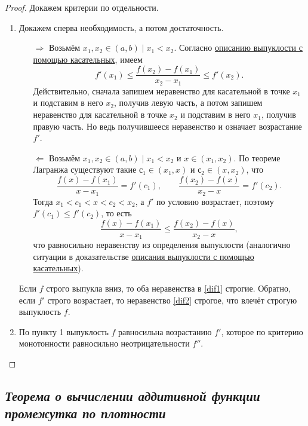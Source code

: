 \begin{proof}
	Докажем критерии по отдельности.
	\begin{enumerate}
		\item Докажем сперва необходимость, а потом достаточность.
		\begin{enumerate}
			\item[\(\Rightarrow\)] \label{dif}Возьмём \(x_1, x_2 \in (a, b) \mid x_1 < x_2\). Согласно \hyperlink{vypkas}{описанию выпуклости с помощью касательных}, имеем
			\begin{equation}
				\label{dif1}
				f'(x_1) \leqslant \frac{f(x_2) - f(x_1)}{x_2 - x_1} \leqslant f'(x_2).
			\end{equation}
			Действительно, сначала запишем неравенство для касательной в точке \(x_1\) и подставим в него \(x_2\), получив левую часть, а потом запишем неравенство для касательной в точке \(x_2\) и подставим в него \(x_1\), получив правую часть. Но ведь получившееся неравенство и означает возрастание \(f'\).
			\item[\(\Leftarrow\)] Возьмём \(x_1, x_2 \in (a, b) \mid x_1 < x_2\) и \(x \in (x_1, x_2)\). По теореме Лагранжа существуют такие \(с_1 \in (x_1, x)\) и \(с_2 \in (x, x_2)\), что \[
				\frac{f(x) - f(x_1)}{x - x_1} = f'(c_1), \qquad \frac{f(x_2) - f(x)}{x_2 - x} = f'(c_2).
			\]
			Тогда \(x_1 < c_1 < x < c_2 < x_2\), а \(f'\) по условию возрастает, поэтому \(f'(c_1) \leqslant f'(c_2)\), то есть
			\begin{equation}
				\label{dif2}
				\frac{f(x) - f(x_1)}{x - x_1} \leqslant \frac{f(x_2) - f(x)}{x_2 - x},	
			\end{equation}
			что равносильно неравенству из определения выпуклости (аналогично ситуации в доказательстве \hyperlink{vypkas}{описания выпуклости с помощью касательных}).
		\end{enumerate}
		
		Если \(f\) строго выпукла вниз, то оба неравенства в \eqref{dif1} строгие. Обратно, если \(f'\) строго возрастает, то неравенство \eqref{dif2} строгое, что влечёт строгую выпуклость \(f\).
		
		\item По пункту 1 выпуклость \(f\) равносильна возрастанию \(f'\), которое по критерию монотонности равносильно неотрицательности \(f''\).
	\end{enumerate}
\end{proof}

\subsection{\itshape Теорема о вычислении аддитивной функции промежутка по плотности}

